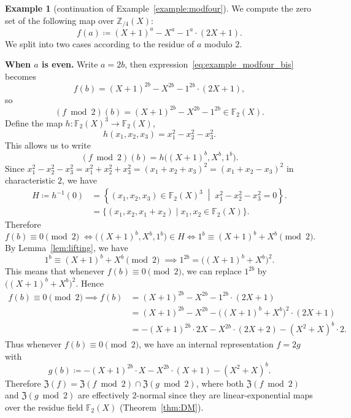 \documentclass[letterpaper, 11pt, thm-restate]{article}
\numberwithin{equation}{section}
\newcommand{\Z}{\mathbb{Z}}
\newcommand{\F}{\mathbb{F}}
\newcommand{\mZ}{\mathfrak{Z}}
\newcommand{\gen}[1]{\langle {#1} \rangle}
\theoremstyle{definition}
\theoremstyle{definition}
\newtheorem{example}[theorem]{Example}
\theoremstyle{definition}
\begin{document}
\begin{example}[continuation of Example~\ref{example:modfour}]\label{example:continued}
    We compute the zero set of the following map over $\Z_{/4}(X)$:
    \begin{equation}\label{eq:example_modfour_bis}
        f(a) \coloneqq (X+1)^a - X^a - 1^a \cdot (2X+1).
    \end{equation}
    We split into two cases according to the residue of $a$ modulo $2$.
    \medskip

    \textbf{When $a$ is even.} Write $a = 2b$, then expression~\eqref{eq:example_modfour_bis} becomes
    \[
    f(b) = (X+1)^{2b} - X^{2b} - 1^{2b} \cdot (2X+1),
    \]
    so
    \[
    (f \bmod 2)(b) = (X+1)^{2b} - X^{2b} - 1^{2b} \in \F_2(X).
    \]
    Define the map $h \colon \F_2(X)^3 \rightarrow \F_2(X)$,
    \[
    h(x_1, x_2, x_3) = x_1^2 - x_2^2 - x_3^2.
    \]
    This allows us to write
    \[
    (f \bmod 2)(b) = h\big((X+1)^b, X^b, 1^b\big).
    \]
    Since $x_1^2 - x_2^2 - x_3^2 = x_1^2 + x_2^2 + x_3^2 = (x_1 + x_2 + x_3)^2 = (x_1 + x_2 - x_3)^2$ in characteristic $2$, we have
    \begin{align*}
    H \coloneqq h^{-1}(0) & = \left\{(x_1, x_2, x_3) \in \F_2(X)^3 \;\middle|\; x_1^2 - x_2^2 - x_3^2 = 0 \right\}. \\
    & = \{(x_1, x_2, x_1 + x_2) \mid x_1, x_2 \in \F_2(X)\}.
    \end{align*}
    Therefore
    \[
    f(b) \equiv 0 \pmod{2} \; \iff \big((X+1)^b, X^b, 1^b\big) \in H \iff  1^b \equiv (X+1)^b + X^b \pmod{2}.
    \]
    By Lemma~\ref{lem:lifting}, we have
    \begin{equation}\label{eq:replace}
    1^b \equiv (X+1)^b + X^b \pmod 2 \; \implies 1^{2b} = \big((X+1)^b + X^b\big)^2.
    \end{equation}
    This means that whenever $f(b) \equiv 0 \pmod 2$, we can replace $1^{2b}$ by $\big((X+1)^b + X^b\big)^2$.
    Hence
    \begin{align*}
    f(b) \equiv 0 \pmod 2 \implies f(b) & = (X+1)^{2b} - X^{2b} - 1^{2b} \cdot (2X+1) \\
    & = (X+1)^{2b} - X^{2b} - \big((X+1)^b + X^b\big)^2 \cdot (2X+1) \\
    & = - (X+1)^{2b} \cdot 2X - X^{2b} \cdot (2X + 2) - (X^2+X)^b \cdot 2.
    \end{align*}
    Thus whenever $f(b) \equiv 0 \pmod 2$, we have an internal representation $f = 2g$ with
    \[
    g(b) \coloneqq - (X+1)^{2b} \cdot X - X^{2b} \cdot (X + 1) - (X^2+X)^b.
    \]
    Therefore $\mZ(f) = \mZ(f \bmod 2) \cap \mZ(g \bmod 2)$, where both $\mZ(f \bmod 2)$ and $\mZ(g \bmod 2)$ are effectively $2$-normal since they are linear-exponential maps over the residue field $\F_2(X)$ (Theorem~\ref{thm:DM}).


\end{example}
\end{document}
